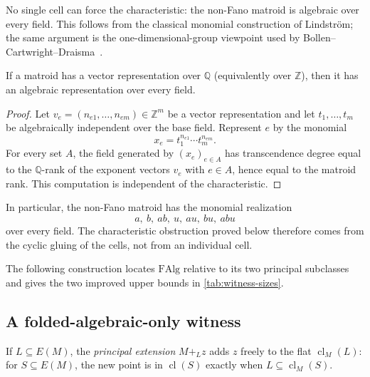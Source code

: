 \documentclass[11pt]{article}
\theoremstyle{definition}
\newcommand{\cl}{\operatorname{cl}}
\newcommand{\FAlg}{\mathrm{FAlg}}
\begin{document}
No single cell can force the characteristic: the non-Fano matroid is algebraic over every field.  This follows from the classical monomial construction of Lindstr\"om; the same argument is the one-dimensional-group viewpoint used by Bollen--Cartwright--Draisma~\cite{Lindstrom1985,BollenCartwrightDraisma2022}.

\begin{lemma}\label{lem:monomial}
If a matroid has a vector representation over $\mathbb Q$ (equivalently over $\mathbb Z$), then it has an algebraic representation over every field.
\end{lemma}
\begin{proof}
Let $v_e=(n_{e1},\dots,n_{em})\in\mathbb Z^m$ be a vector representation and let $t_1,\dots,t_m$ be algebraically independent over the base field.  Represent $e$ by the monomial
\[
x_e=t_1^{n_{e1}}\cdots t_m^{n_{em}}.
\]
For every set $A$, the field generated by $(x_e)_{e\in A}$ has transcendence degree equal to the $\mathbb Q$-rank of the exponent vectors $v_e$ with $e\in A$, hence equal to the matroid rank.  This computation is independent of the characteristic.
\end{proof}

In particular, the non-Fano matroid has the monomial realization
\[
a,\ b,\ ab,\ u,\ au,\ bu,\ abu
\]
over every field.  The characteristic obstruction proved below therefore comes from the cyclic gluing of the cells, not from an individual cell.

The following construction locates $\FAlg$ relative to its two principal subclasses and gives the two improved upper bounds in \cref{tab:witness-sizes}.

\subsection{A folded-algebraic-only witness}\label{subsec:m33}

If $L\subseteq E(M)$, the \emph{principal extension} $M+_Lz$ adds $z$ freely to the flat $\cl_M(L)$: for $S\subseteq E(M)$, the new point is in $\cl(S)$ exactly when $L\subseteq\cl_M(S)$.
\end{document}

